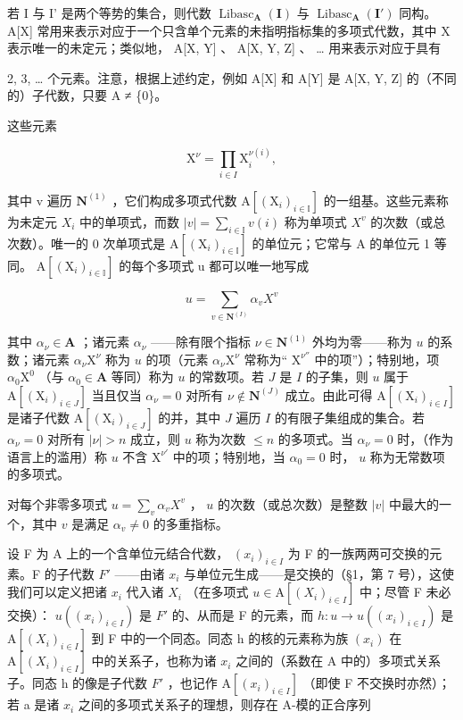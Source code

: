 若 I 与 I' 是两个等势的集合，则代数 \(\operatorname{Libasc}_{\mathbf{A}}(\mathbf{I})\) 与 \(\operatorname{Libasc}_{\mathbf{A}}(\mathbf{I}')\) 同构。 A{[}X{]} 常用来表示对应于一个只含单个元素的未指明指标集的多项式代数，其中 X 表示唯一的未定元；类似地， A{[}X, Y{]} 、 A{[}X, Y, Z{]} 、 \ldots{} 用来表示对应于具有

2, 3, \ldots{} 个元素。注意，根据上述约定，例如 A{[}X{]} 和 A{[}Y{]} 是 A{[}X, Y, Z{]} 的（不同的）子代数，只要 A ≠ \{0\}。

这些元素

\[
\mathrm{X} ^ {\nu} = \prod_ {i \in I} \mathrm{X} _ {i} ^ {\nu (i)},
\]

其中 v 遍历 \(\mathbf{N}^{(1)}\) ，它们构成多项式代数 \(\mathrm{A}[(\mathrm{X}_{i})_{i\in\mathbb{I}}]\) 的一组基。这些元素称为未定元 \(X_{i}\) 中的单项式，而数 \(|v|=\sum_{i\in\mathbb{I}}v(i)\) 称为单项式 \(X^{v}\) 的次数（或总次数）。唯一的 0 次单项式是 \(\mathrm{A}[(\mathrm{X}_{i})_{i\in\mathbb{I}}]\) 的单位元；它常与 A 的单位元 1 等同。 \(\mathrm{A}[(\mathrm{X}_{i})_{i\in\mathbb{I}}]\) 的每个多项式 u 都可以唯一地写成

\[
u = \sum_ {v \in \mathbf {N} ^ {(I)}} \alpha_ {v} X ^ {v}
\]

其中 \(\alpha_{\nu} \in \mathbf{A}\) ；诸元素 \(\alpha_{\nu}\) ——除有限个指标 \(\nu \in \mathbf{N}^{(1)}\) 外均为零——称为 \(u\) 的系数；诸元素 \(\alpha_{\nu} \mathrm{X}^{\nu}\) 称为 \(u\) 的项（元素 \(\alpha_{\nu} \mathrm{X}^{\nu}\) 常称为“ \(\mathrm{X}^{\nu''}\) 中的项”）；特别地，项 \(\alpha_{0} \mathrm{X}^{0}\) （与 \(\alpha_{0} \in \mathbf{A}\) 等同）称为 \(u\) 的常数项。若 \(J\) 是 \(I\) 的子集，则 \(u\) 属于 \(\mathrm{A}[(\mathrm{X}_{i})_{i \in J}]\) 当且仅当 \(\alpha_{\nu} = 0\) 对所有 \(\nu \notin \mathbf{N}^{(J)}\) 成立。由此可得 \(\mathrm{A}[(\mathrm{X}_{i})_{i \in I}]\) 是诸子代数 \(\mathrm{A}[(\mathrm{X}_{i})_{i \in J}]\) 的并，其中 \(J\) 遍历 \(I\) 的有限子集组成的集合。若 \(\alpha_{\nu} = 0\) 对所有 \(|\nu| > n\) 成立，则 \(u\) 称为次数 \(\leqslant n\) 的多项式。当 \(\alpha_{\nu} = 0\) 时，（作为语言上的滥用）称 \(u\) 不含 \(\mathrm{X}^{\nu'}\) 中的项；特别地，当 \(\alpha_{0} = 0\) 时， \(u\) 称为无常数项的多项式。

对每个非零多项式 \(u = \sum_{v} \alpha_v X^v\) ， \(u\) 的次数（或总次数）是整数 \(|v|\) 中最大的一个，其中 \(v\) 是满足 \(\alpha_v \neq 0\) 的多重指标。

设 F 为 A 上的一个含单位元结合代数， \((x_{i})_{i\in I}\) 为 F 的一族两两可交换的元素。F 的子代数 \(F'\) ——由诸 \(x_{i}\) 与单位元生成——是交换的（§1，第 7 号），这使我们可以定义把诸 \(x_{i}\) 代入诸 \(X_{i}\) （在多项式 \(u\in\mathrm{A}[(X_{i})_{i\in I}]\) 中；尽管 F 未必交换）： \(u((x_{i})_{i\in I})\) 是 \(F'\) 的、从而是 F 的元素，而 \(h\colon u\to u((x_{i})_{i\in I})\) 是 \(\mathrm{A}[(X_{i})_{i\in I}]\) 到 F 中的一个同态。同态 h 的核的元素称为族 \((x_{i})\) 在 \(\mathrm{A}[(X_{i})_{i\in I}]\) 中的关系子，也称为诸 \(x_{i}\) 之间的（系数在 A 中的）多项式关系子。同态 h 的像是子代数 \(F'\) ，也记作 \(\mathrm{A}[(x_{i})_{i\in I}]\) （即使 F 不交换时亦然）；若 a 是诸 \(x_{i}\) 之间的多项式关系子的理想，则存在 A-模的正合序列


